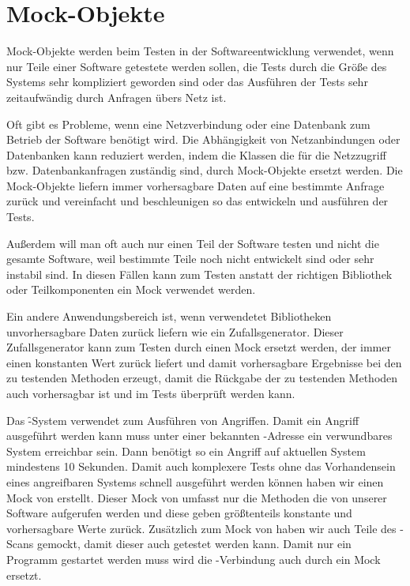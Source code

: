 \section{Mock-Objekte}
\label{sec:test_mock}
\authors{\HM}{\LM \and \MW \and \JF}

Mock-Objekte werden beim Testen in der Softwareentwicklung verwendet, wenn nur
Teile einer Software getestete werden sollen, die Tests durch die Größe des Systems
sehr kompliziert geworden sind oder das Ausführen der Tests sehr zeitaufwändig \zB durch Anfragen übers Netz ist.

Oft gibt es Probleme, wenn eine Netzverbindung oder eine Datenbank zum
Betrieb der Software benötigt wird.
Die Abhängigkeit von Netzanbindungen oder Datenbanken kann \zB reduziert
werden, indem die Klassen die für die Netzzugriff bzw. Datenbankanfragen
zuständig sind, durch Mock-Objekte ersetzt werden. Die Mock-Objekte
liefern immer vorhersagbare Daten auf eine bestimmte Anfrage zurück und
vereinfacht und beschleunigen so das entwickeln und ausführen der Tests.

Außerdem will man oft auch nur einen Teil der Software testen und nicht die
gesamte Software, weil \zB bestimmte Teile noch nicht entwickelt sind oder
sehr instabil sind. In diesen Fällen kann zum Testen anstatt der richtigen
Bibliothek oder Teilkomponenten ein Mock verwendet werden.

Ein andere Anwendungsbereich ist, wenn verwendetet Bibliotheken unvorhersagbare Daten zurück liefern wie
\zB ein Zufallsgenerator. Dieser Zufallsgenerator kann zum
Testen durch einen Mock ersetzt werden, der immer einen konstanten Wert
zurück liefert und damit vorhersagbare Ergebnisse bei den zu testenden Methoden
erzeugt, damit die Rückgabe der zu testenden Methoden auch vorhersagbar ist
und im Tests überprüft werden kann.

Das \f-System verwendet  zum Ausführen von Angriffen.
Damit ein Angriff ausgeführt werden kann muss unter einer bekannten
-Adresse ein verwundbares System erreichbar sein.
Dann benötigt so ein Angriff auf aktuellen System mindestens
10 Sekunden.
Damit auch komplexere Tests ohne das Vorhandensein eines angreifbaren
Systems schnell ausgeführt werden können haben wir einen Mock von
 erstellt.
Dieser Mock von  umfasst nur die Methoden die von unserer
Software aufgerufen werden und diese geben größtenteils konstante
und vorhersagbare Werte zurück.
Zusätzlich zum Mock von  haben wir auch Teile des -Scans
gemockt, damit dieser auch getestet werden kann.
Damit nur ein Programm gestartet werden muss wird die -Verbindung
auch durch ein Mock ersetzt.

